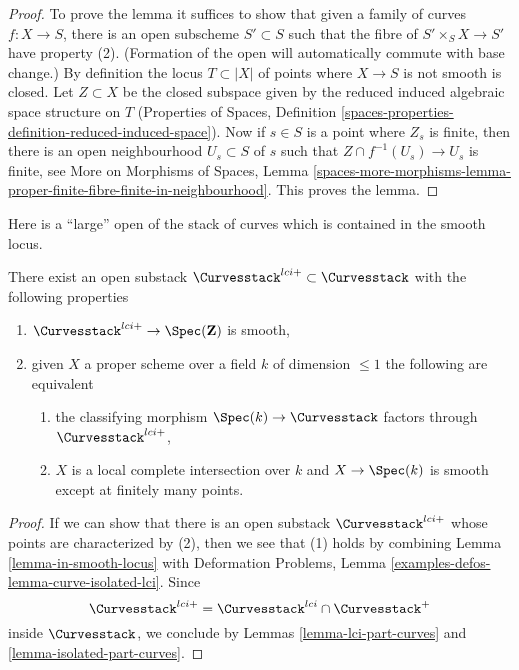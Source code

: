 \begin{proof}
To prove the lemma it suffices to show that given a family of curves
$f : X \to S$, there is an open subscheme $S' \subset S$
such that the fibre of $S' \times_S X \to S'$ have property (2).
(Formation of the open will automatically commute with base change.)
By definition the locus $T \subset |X|$ of points where $X \to S$
is not smooth is closed. Let $Z \subset X$ be the closed subspace
given by the reduced induced algebraic space structure on $T$
(Properties of Spaces, Definition
\ref{spaces-properties-definition-reduced-induced-space}).
Now if $s \in S$ is a point where $Z_s$ is finite, then there
is an open neighbourhood $U_s \subset S$ of $s$ such that
$Z \cap f^{-1}(U_s) \to U_s$ is finite, see
More on Morphisms of Spaces, Lemma
\ref{spaces-more-morphisms-lemma-proper-finite-fibre-finite-in-neighbourhood}.
This proves the lemma.
\end{proof}

\noindent
Here is a ``large'' open of the stack of curves which is contained
in the smooth locus.

\begin{lemma}
\label{lemma-big-smooth-part-curves}
There exist an open substack
$\Curvesstack^{lci+} \subset \Curvesstack$
with the following properties
\begin{enumerate}
\item $\Curvesstack^{lci+} \to \Spec(\mathbf{Z})$ is smooth,
\item given $X$ a proper scheme over a field $k$ of dimension $\leq 1$
the following are equivalent
\begin{enumerate}
\item the classifying morphism $\Spec(k) \to \Curvesstack$ factors
through $\Curvesstack^{lci+}$,
\item $X$ is a local complete intersection over $k$ and
$X \to \Spec(k)$ is smooth except at finitely many points.
\end{enumerate}
\end{enumerate}
\end{lemma}

\begin{proof}
If we can show that there is an open substack $\Curvesstack^{lci+}$
whose points are characterized by (2), then we see that
(1) holds by combining Lemma \ref{lemma-in-smooth-locus} with
Deformation Problems, Lemma \ref{examples-defos-lemma-curve-isolated-lci}.
Since
$$
\Curvesstack^{lci+} = \Curvesstack^{lci} \cap \Curvesstack^{+}
$$
inside $\Curvesstack$, we conclude by
Lemmas \ref{lemma-lci-part-curves} and \ref{lemma-isolated-part-curves}.
\end{proof}




